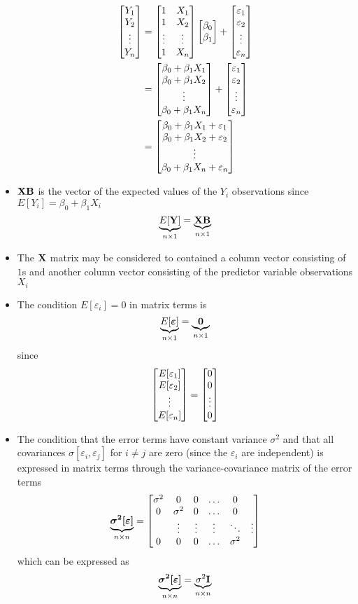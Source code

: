 \begin{itemize}
$$\begin{aligned}
\begin{bmatrix} Y_1 \\ Y_2 \\ \vdots \\ Y_n \end{bmatrix} &= \begin{bmatrix} 1 & X_1 \\ 1 & X_2 \\ \vdots & \vdots \\ 1 & X_n \end{bmatrix}\begin{bmatrix} \beta_0 \\ \beta_1 \end{bmatrix} + \begin{bmatrix}  \varepsilon_1 \\ \varepsilon_2 \\ \vdots \\ \varepsilon_n \end{bmatrix} \\ &= \begin{bmatrix} \beta_0 + \beta_1X_1 \\ \beta_0 + \beta_1X_2 \\ \vdots \\ \beta_0 + \beta_1X_n \end{bmatrix} + \begin{bmatrix} \varepsilon_1 \\ \varepsilon_2 \\ \vdots \\ \varepsilon_n \end{bmatrix} \\ &= \begin{bmatrix} \beta_0 + \beta_1X_1 + \varepsilon_1 \\ \beta_0 + \beta_1X_2 + \varepsilon_2 \\ \vdots \\ \beta_0 + \beta_1X_n + \varepsilon_n \end{bmatrix} \end{aligned} $$ 
\item $\mathbf{XB}$ is the vector of the expected values of the $Y_i$ observations since $E[Y_i] = \beta_0 + \beta_1X_i$ $$ \underbrace{E[\mathbf{Y}]}_{n \times 1} = \underbrace{\mathbf{XB}}_{n \times 1} $$ 
\item The $\mathbf{X}$ matrix may be considered to contained a column vector consisting of $1$s and another column vector consisting of the predictor variable observations $X_i$
\item The condition $E[\varepsilon_i] = 0$ in matrix terms is $$ \underbrace{E[\bm{\varepsilon}]}_{n \times 1} = \underbrace{\mathbf{0}}_{n \times 1} $$ since $$ \begin{bmatrix} E[\varepsilon_1] \\ E[\varepsilon_2] \\ \vdots \\ E[\varepsilon_n] \end{bmatrix} = \begin{bmatrix} 0 \\ 0 \\ \vdots \\ 0 \end{bmatrix} $$ 
\item The condition that the error terms have constant variance $\sigma^2$ and that all covariances $\sigma[\varepsilon_i, \varepsilon_j]$ for $i\neq j$ are zero (since the $\varepsilon_i$ are independent) is expressed in matrix terms through the variance-covariance matrix of the error terms $$ \underbrace{\bm{\sigma^2[\varepsilon]}}_{n \times n} = \begin{bmatrix} \sigma^2 & 0 & 0 & \hdots & 0 \\ 0 & \sigma^2 & 0 & \hdots & 0 \\ &\vdots & \vdots & \vdots & \ddots & \vdots \\ 0 & 0 & 0 & \hdots & \sigma^2 \end{bmatrix} $$ which can be expressed as $$ \underbrace{\bm{\sigma^2[\varepsilon]}}_{n \times n} = \underbrace{\sigma^2 \mathbf{I}}_{n \times n} $$ 

\end{itemize}

